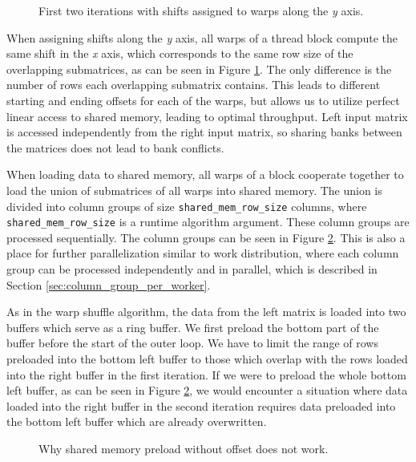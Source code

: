 \begin{figure}[ht]
	\centering
	\def\svgwidth{\textwidth}
	
	\caption{First two iterations with shifts assigned to warps along the \textit{y} axis.}
	\label{fig:warp_per_shift_shared_mem_shifts}
\end{figure}

When assigning shifts along the \textit{y} axis, all warps of a thread block compute the same shift in the \textit{x} axis, which corresponds to the same row size of the overlapping submatrices, as can be seen in Figure \ref{fig:warp_per_shift_shared_mem_shifts}. The only difference is the number of rows each overlapping submatrix contains. This leads to different starting and ending offsets for each of the warps, but allows us to utilize perfect linear access to shared memory, leading to optimal throughput. Left input matrix is accessed independently from the right input matrix, so sharing banks between the matrices does not lead to bank conflicts.

When loading data to shared memory, all warps of a block cooperate together to load the union of submatrices of all warps into shared memory. The union is divided into column groups of size \texttt{shared\_mem\_row\_size} columns, where \texttt{shared\_mem\_row\_size} is a runtime algorithm argument. These column groups are processed sequentially. The column groups can be seen in Figure \ref{fig:shared_mem_preload_offset}. This is also a place for further parallelization similar to work distribution, where each column group can be processed independently and in parallel, which is described in Section \ref{sec:column_group_per_worker}.

As in the warp shuffle algorithm, the data from the left matrix is loaded into two buffers which serve as a ring buffer. We first preload the bottom part of the buffer before the start of the outer loop. We have to limit the range of rows preloaded into the bottom left buffer to those which overlap with the rows loaded into the right buffer in the first iteration. If we were to preload the whole bottom left buffer, as can be seen in Figure \ref{fig:shared_mem_preload_offset}, we would encounter a situation where data loaded into the right buffer in the second iteration requires data preloaded into the bottom left buffer which are already overwritten.

\begin{figure}[ht]
	\centering
	\def\svgwidth{\textwidth}
	
	\caption{Why shared memory preload without offset does not work.}
	\label{fig:shared_mem_preload_offset}
\end{figure}


